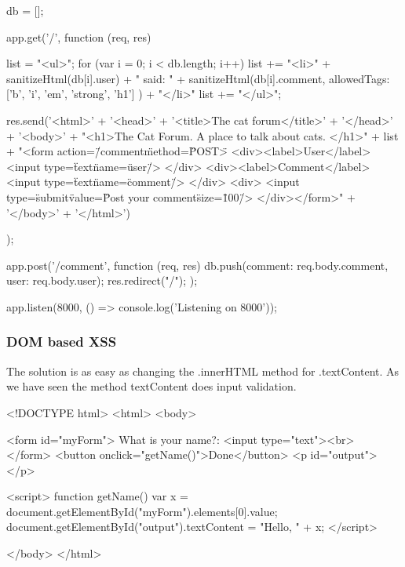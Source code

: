 \begin{Answer}[ref={websec-xss-prevention}]
\begin{js}
db = [];

app.get('/', function (req, res) {
  list = "<ul>";
  for (var i = 0; i < db.length; i++) {
    list += "<li>" + sanitizeHtml(db[i].user) + " said: " + sanitizeHtml(db[i].comment, {
      allowedTags: ['b', 'i', 'em', 'strong', 'h1']
    }) + "</li>"
  }
  list += "</ul>";
  
  res.send('<html>' +
    '<head>' +
    '<title>The cat forum</title>' +
    '</head>' +
    '<body>' +
    "<h1>The Cat Forum. A place to talk about cats. </h1>" +
    list +
    "<form action=\"/comment\" method=\"POST\">
    <div><label>User</label>
      <input type=\"text\" name=\"user\"/>
    </div>
    <div><label>Comment</label>
      <input type=\"text\" name=\"comment\"/>
    </div>
    <div>
      <input type=\"submit\" value=\"Post your comment\" size=\"100\"/>
    </div></form>" +
    '</body>' +
  '</html>')
});

app.post('/comment', function (req, res) {
  db.push({comment: req.body.comment, user: req.body.user});
  res.redirect("/");
});

app.listen(8000, () => console.log('Listening on 8000'));
\end{js}
\subsubsection{DOM based XSS}
The solution is as easy as changing the .innerHTML method for .textContent. As we have seen the method textContent does input validation.
\begin{html}
<!DOCTYPE html>
<html>
<body>

  <form id="myForm">
    What is your name?: <input type="text"><br>
  </form>
  <button onclick="getName()">Done</button>
  <p id="output"></p>
  
  <script>
  function getName(){
    var x = document.getElementById("myForm").elements[0].value;
    document.getElementById("output").textContent = "Hello, " + x;
  }
  </script>

</body>
</html>
\end{html}
\end{Answer}